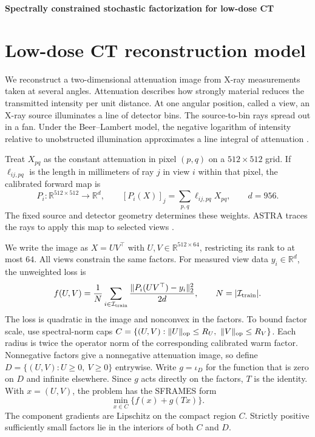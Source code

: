 \documentclass[11pt]{article}
\begin{document}
\begin{center}
  \Large\bfseries Spectrally constrained stochastic factorization for low-dose CT
\end{center}

\section{Low-dose CT reconstruction model}
We reconstruct a two-dimensional attenuation image from X-ray measurements
taken at several angles. Attenuation describes how strongly material reduces
the transmitted intensity per unit distance. At one angular position, called
a view, an X-ray source illuminates a line of detector bins. The source-to-bin
rays spread out in a fan. Under the Beer--Lambert model, the negative logarithm
of intensity relative to unobstructed illumination approximates a line integral
of attenuation \cite{detect}.

Treat \(X_{pq}\) as the constant attenuation in pixel \((p,q)\) on a
\(512\times512\) grid. If \(\ell_{ij,pq}\) is the length in millimeters
of ray \(j\) in view \(i\) within that pixel, the calibrated forward map is
\[
  P_i\colon\mathbb R^{512\times512}\longrightarrow\mathbb R^d,\qquad
  [P_i(X)]_j=\sum_{p,q}\ell_{ij,pq}X_{pq},\qquad d=956.
\]
The fixed source and detector geometry determines these weights. ASTRA traces
the rays to apply this map to selected views \cite{astra}.

We write the image as \(X=UV^\top\) with \(U,V\in\mathbb R^{512\times64}\),
restricting its rank to at most \(64\). All views constrain the same factors.
For measured view data \(y_i\in\mathbb R^d\), the unweighted loss is
\[
  f(U,V) = \frac{1}{N}\sum_{i\in\mathcal I_{\rm train}}
    \frac{\|P_i(UV^\top)-y_i\|_2^2}{2d},
  \qquad N=|\mathcal I_{\rm train}|.
\]
The loss is quadratic in the image and nonconvex in the factors. To bound
factor scale, use spectral-norm caps
\(C=\{(U,V):\|U\|_{\rm op}\le R_U,\ \|V\|_{\rm op}\le R_V\}\).
Each radius is twice the operator norm of the corresponding calibrated warm
factor. Nonnegative factors give a nonnegative attenuation image, so define
\(D=\{(U,V):U\ge0,\ V\ge0\}\) entrywise. Write \(g=\iota_D\) for the
function that is zero on \(D\) and infinite elsewhere. Since \(g\) acts
directly on the factors, \(T\) is the identity. With \(x=(U,V)\), the
problem has the SFRAMES form
\[
  \min_{x\in C}\{f(x)+g(Tx)\}.
\]
The component gradients are Lipschitz on the compact region \(C\). Strictly
positive sufficiently small factors lie in the interiors of both \(C\) and
\(D\).
\end{document}
